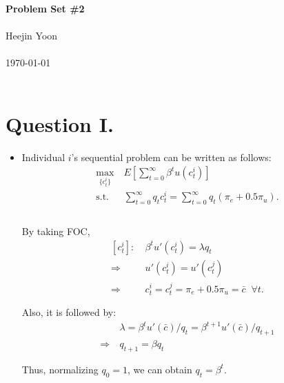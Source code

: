 \documentclass[11pt]{article}
\theoremstyle{definition}
\theoremstyle{definition}
\theoremstyle{definition}
\theoremstyle{definition}
\theoremstyle{definition}
\theoremstyle{definition}
\begin{document}
	\begin{center}
		\Large{\textbf{Problem Set \#2}}
		\\~ \\ Heejin Yoon 
		\\~ \\ \small{\today}
		\\~
	\end{center}
	

\section*{Question I.}
\begin{itemize}
\item Individual $i$'s sequential problem can be written as follows: \\
\begin{equation*}
	\begin{split}
		\max_{\{c_{t}^{i}\}}\:&E[\sum_{t=0}^{\infty}\beta^{t}u(c_{t}^{i})]\\
		\text{s.t.}\; &\sum_{t=0}^{\infty}q_{t}c_{t}^{i}=\sum_{t=0}^{\infty}q_{t}(\pi_{e}+0.5\pi_{u}).\\
		\;\\
	\end{split}
\end{equation*}

By taking FOC,
\begin{equation*}
	\begin{split}
	[c_{t}^{i}]:\: & \beta^{t}u'(c_{t}^{i})=\lambda q_{t} \\
	\Rightarrow\: & u'(c_{t}^{i})=u'(c_{t}^{j}) \\
	\Rightarrow\: & c_{t}^{i}=c_{t}^{j}=\pi_{e}+0.5\pi_{u}=\bar{c} \;\; \forall t.\\ 
	\;\\
	\end{split}
\end{equation*}
Also, it is followed by:
\begin{equation*}
	\begin{split}
		& \lambda = \beta^{t}u'(\bar{c})/q_{t}=\beta^{t+1}u'(\bar{c})/q_{t+1}  \\
		\Rightarrow\: & q_{t+1} =\beta q_{t}  \\
		\;\\
	\end{split}
\end{equation*}
Thus, normalizing $q_0=1$, we can obtain $q_t=\beta^{t}$.
	
\end{itemize}
\end{document}
